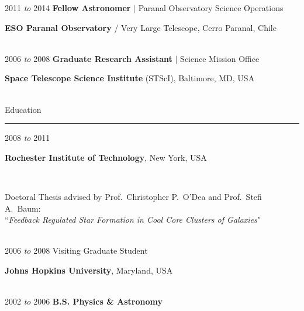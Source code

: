 \documentclass[11pt]{article}
\makeatletter
\def\vhrulefill#1{\leavevmode\leaders\hrule\@height#1\hfill \kern\z@}
\makeatother
\begin{document}
\hspace{2.5mm} 2011 {\it to} 2014 \hspace{17mm} \textbf{Fellow Astronomer} $|$ Paranal Observatory Science Operations

\hspace{42mm} \parbox{5.15in}{{\bf ESO Paranal Observatory} / Very Large Telescope, Cerro Paranal, Chile} \\



\hspace{2.5mm} 2006 {\it to} 2008 \hspace{17mm} \textbf{Graduate Research Assistant} $|$ Science Mission Office 

\hspace{42mm} \parbox{5.15in}{{\bf Space Telescope Science Institute} (STScI), Baltimore, MD, USA} \\



{\sc Education} \vhrulefill{0.4pt}

\vspace{2mm}


\hspace{2.5mm}2008 {\it to} 2011 

\hspace{42mm}\parbox{5.15in}{{\bf Rochester Institute of Technology}, New York, USA} \\



\hspace{42mm} \parbox{5.15in}{Doctoral Thesis advised by Prof.~Christopher P.~O'Dea and Prof.~Stefi A.~Baum: \\ ``{\it Feedback Regulated Star Formation in Cool Core Clusters of Galaxies}"} \\




\hspace{2.5mm}2006 {\it to} 2008  \hspace{18mm} Visiting Graduate Student

\hspace{42mm} \parbox{5.15in}{{\bf Johns Hopkins University}, Maryland, USA} \\



\hspace{2.5mm} 2002 {\it to} 2006 \hspace{17mm} {{\bf B.S. Physics \& Astronomy}}
\end{document}
